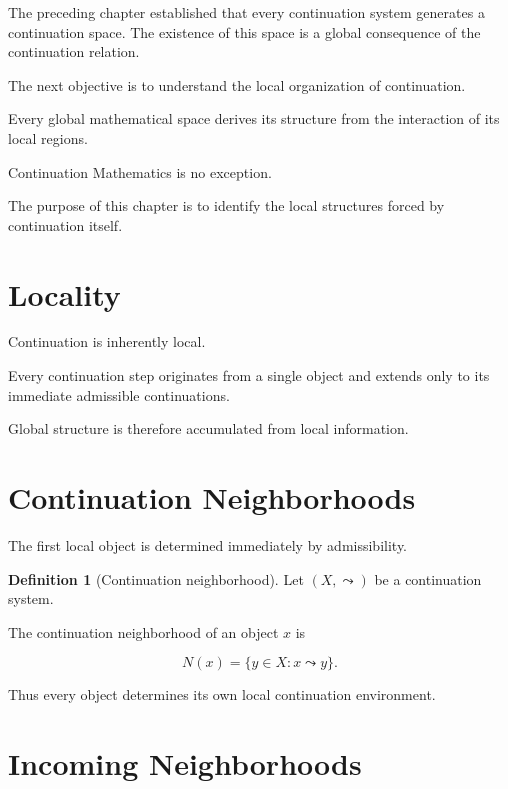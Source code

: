 \documentclass[13pt,openany]{book}
\theoremstyle{plain}
\theoremstyle{definition}
\newtheorem{definition}{Definition}[chapter]
\begin{document}
The preceding chapter established that every continuation system generates a
continuation space. The existence of this space is a global consequence of the
continuation relation.

The next objective is to understand the local organization of continuation.

Every global mathematical space derives its structure from the interaction of
its local regions.

Continuation Mathematics is no exception.

The purpose of this chapter is to identify the local structures forced by
continuation itself.


\section{Locality}

Continuation is inherently local.

Every continuation step originates from a single object and extends only to its
immediate admissible continuations.

Global structure is therefore accumulated from local information.


\section{Continuation Neighborhoods}

The first local object is determined immediately by admissibility.

\begin{definition}[Continuation neighborhood]

Let $(X,\leadsto)$ be a continuation system.

The continuation neighborhood of an object $x$ is

\[
N(x)
=
\{
y\in X:
x\leadsto y
\}.
\]

\end{definition}

Thus every object determines its own local continuation environment.


\section{Incoming Neighborhoods}
\end{document}
